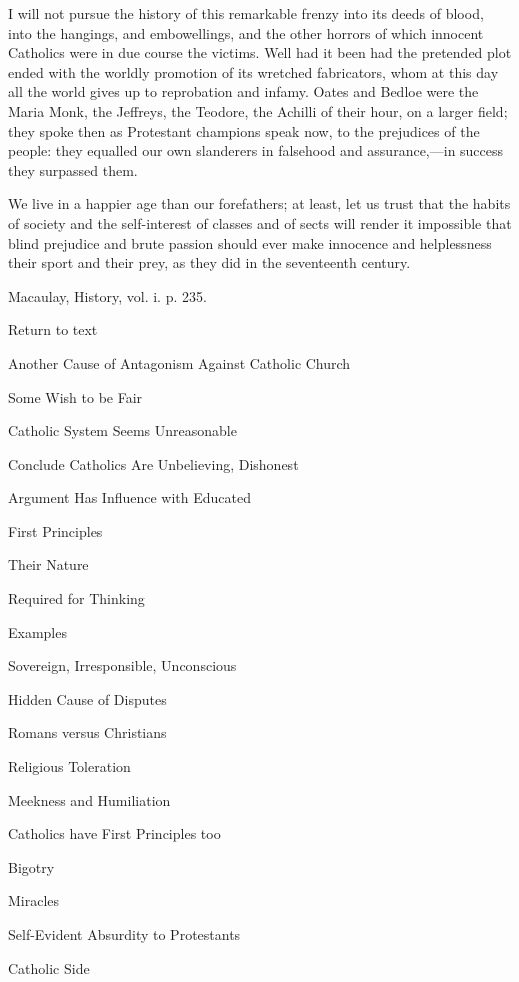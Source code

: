 I will not pursue the history of this remarkable
frenzy into its deeds of blood, into the hangings, and
embowellings, and the other horrors of which innocent
Catholics were in due course the victims. Well had it
been had the pretended plot ended with the worldly
promotion of its wretched fabricators, whom at this day
all the world gives up to reprobation and infamy. Oates
and Bedloe were the Maria Monk, the Jeffreys, the
Teodore, the Achilli of their hour, on a larger field;
they spoke then as Protestant champions speak now, to the
prejudices of the people: they equalled our own
slanderers in falsehood and assurance,—in success
they surpassed them.

We live in a happier age than our forefathers; at
least, let us trust that the habits of society and the self-interest of classes and of sects will render it
impossible that blind prejudice and brute passion should
ever make innocence and helplessness their sport and
their prey, as they did in the seventeenth century.


Macaulay, History, vol. i. p.
235.

Return to text


Another Cause of
Antagonism Against Catholic Church

Some Wish to be Fair

Catholic System
Seems Unreasonable

Conclude
Catholics Are Unbelieving, Dishonest

Argument Has
Influence with Educated

First Principles

Their Nature

Required for
Thinking

Examples

Sovereign,
Irresponsible, Unconscious

Hidden Cause of
Disputes

Romans versus Christians

Religious
Toleration

Meekness and Humiliation

Catholics have First Principles too

Bigotry

Miracles

Self-Evident
Absurdity to Protestants

Catholic Side

